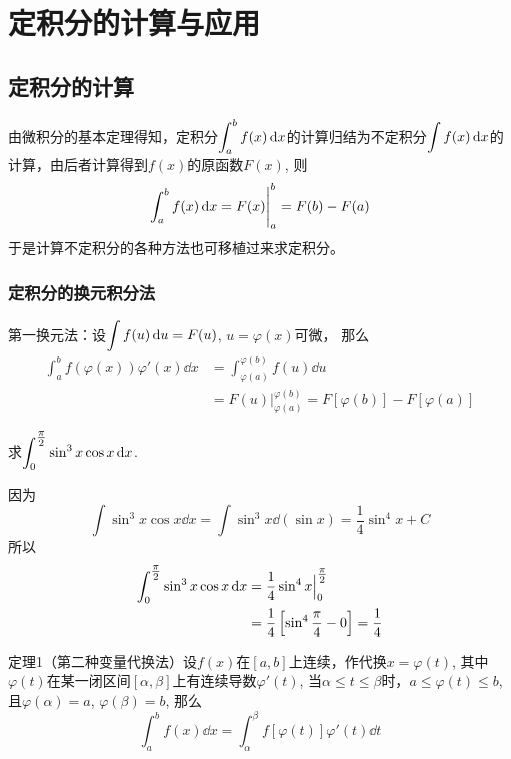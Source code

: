 \section{定积分的计算与应用}

\subsection{定积分的计算}

由微积分的基本定理得知，定积分$\displaystyle\int^b_a f(x)\,{\rm d} x$的计算归结为不定积分$\displaystyle\int f(x)\,{\rm d} x$的计算，由后者计算得到$f(x)$的原函数$F(x)$, 则
\[\displaystyle\int^b_a f(x)\,{\rm d} x=F (x)\Bigg|^b_a=F (b) -F (a)\] 
于是计算不定积分的各种方法也可移植过来求定积分。

\subsubsection{定积分的换元积分法}

第一换元法：设$\displaystyle\int f(u)\,{\rm d} u=F(u)$, $u=\varphi(x)$可微，
那么
\[\begin{split}
    \int^b_a f(\varphi(x))\varphi'(x)\dd x&=\int^{\varphi(b)}_{\varphi(a)}f(u)\dd u\\
    &=F(u)\Big|^{\varphi(b)}_{\varphi(a)}=F[{\varphi(b)}]-F[{\varphi(a)}]
\end{split}\]

\begin{example}
    求$\displaystyle\int^{\tfrac{\pi}{2}}_0 \sin^3x \cos x\,{\rm d} x$.
\end{example}

\begin{solution}
    因为
\[\int \sin^3x\cos x\dd x= \int \sin^3x\dd (\sin x) =\frac{1}{4}\sin^4x+C\]
所以
\[\begin{split}
    \displaystyle\int^{\tfrac{\pi}{2}}_0 \sin^3x \cos x\,{\rm d} x&=\dfrac{1}{4}\sin^4 x\Big|^{\tfrac{\pi}{2}}_0 \\
    &=\dfrac{1}{4}\left[\sin^4\dfrac{\pi}{4}-0\right]=\dfrac{1}{4}
\end{split}\]
\end{solution}

\begin{blk}
 {定理1（第二种变量代换法）}设$f(x)$在$[a,b]$上连续，作代换$x=\varphi (t)$, 其中$\varphi (t)$在某一闭区间$[\alpha,\beta]$上有连续导数$\varphi '(t)$, 当$\alpha\le t\le \beta$时，$a\le \varphi (t)\le b$, 且$\varphi (\alpha)=a$, $\varphi (\beta)=b$, 那么
\[\int^b_a f(x) \dd x= \int^{\beta}_{\alpha} f [\varphi  (t) ] \varphi ' (t) \dd t\]   
\end{blk}

